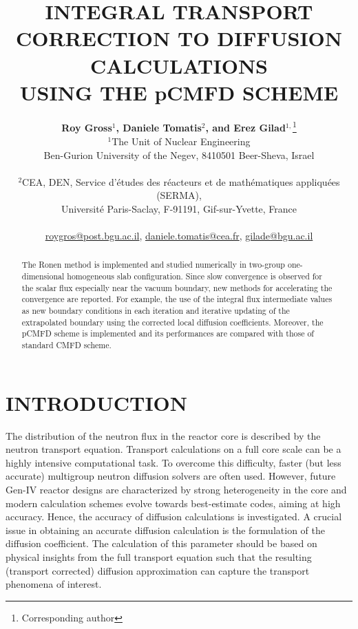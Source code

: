 \documentclass[letterpaper]{physor2020}
\title{INTEGRAL TRANSPORT CORRECTION TO DIFFUSION CALCULATIONS\\USING THE pCMFD SCHEME}
\author{%
  \textbf{Roy Gross$^1$, Daniele Tomatis$^2$, and Erez Gilad$^{1,}$}\footnote{Corresponding author} \\
  $^1$The Unit of Nuclear Engineering \\
  Ben-Gurion University of the Negev, 8410501 Beer-Sheva, Israel \\ 
\\
  $^2$CEA, DEN, Service d’\'etudes des r\'eacteurs et
      de math\'ematiques appliqu\'ees (SERMA), \\
    Universit\'e Paris-Saclay, F-91191, Gif-sur-Yvette, France \\
     \\
  \url{roygros@post.bgu.ac.il},
  \url{daniele.tomatis@cea.fr},
  \url{gilade@bgu.ac.il}
}
\begin{document}
\maketitle
\justify

\begin{abstract}
  The Ronen method is implemented and studied numerically in two-group one-dimensional homogeneous slab configuration. Since slow convergence is observed for the scalar flux especially near the vacuum boundary, new methods for accelerating the convergence are reported. For example, the use of the integral flux intermediate values as new boundary conditions in each iteration and iterative updating of the extrapolated boundary using the corrected local diffusion coefficients. Moreover, the pCMFD scheme is implemented and its performances are compared with those of standard CMFD scheme.
\end{abstract}

\section{INTRODUCTION}
\label{sec:intro}

The distribution of the neutron flux in the reactor core is described by the neutron transport equation. Transport calculations on a full core scale can be a highly intensive computational task. To overcome this difficulty, faster (but less accurate) multigroup neutron diffusion solvers are often used. However, future Gen-IV reactor designs are characterized by strong heterogeneity in the core and modern calculation schemes evolve towards best-estimate codes, aiming at high accuracy. Hence, the accuracy of diffusion calculations is investigated. A crucial issue in obtaining an accurate diffusion calculation is the formulation of the diffusion coefficient. The calculation of this parameter should be based on physical insights from the full transport equation such that the resulting (transport corrected) diffusion approximation can capture the transport phenomena of interest.
\end{document}
